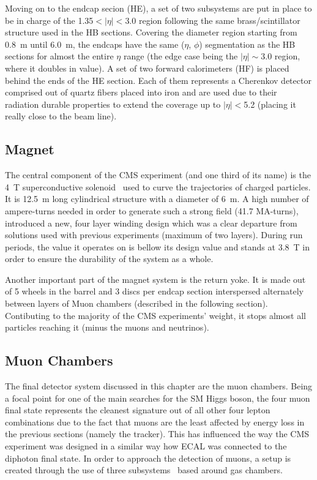 \hspace{10pt} Moving on to the endcap secion (HE), a set of two subsystems are put in place to be in charge of the 1.35$<|\eta|<$3.0 region following the same brass/scintillator structure used in the HB sections. Covering the diameter region starting from 0.8~m until 6.0~m, the endcaps have the same ($\eta$, $\phi$) segmentation as the HB sections for almost the entire $\eta$ range (the edge case being the $|\eta|\sim$3.0 region, where it doubles in value). A set of two forward calorimeters (HF) is placed behind the ends of the HE section. Each of them represents a Cherenkov detector comprised out of quartz fibers placed into iron and are used due to their radiation durable properties to extend the coverage up to $|\eta|<$5.2 (placing it really close to the beam line).


\subsection{Magnet}
\hspace{10pt} The central component of the CMS experiment (and one third of its name) is the 4~T superconductive solenoid~\cite{cms:paper} used to curve the trajectories of charged particles. It is 12.5~m long cylindrical structure with a diameter of 6~m. A high number of ampere-turns needed in order to generate such a strong field (41.7 MA-turns), introduced a new, four layer winding design which was a clear departure from solutions used with previous experiments (maximum of two layers). During run periods, the value it operates on is bellow its design value and stands at 3.8~T in order to ensure the durability of the system as a whole.

\hspace{10pt} Another important part of the magnet system is the return yoke. It is made out of 5 wheels in the barrel and 3 discs per endcap section interspersed alternately between layers of Muon chambers (described in the following section). Contibuting to the majority of the CMS experiments' weight, it stops almost all particles reaching it (minus the muons and neutrinos).
\subsection{Muon Chambers}
\label{subsec:cmsmuon}
\hspace{10pt} The final detector system discussed in this chapter are the muon chambers. Being a focal point for one of the main searches for the SM Higgs boson, the four muon final state represents the cleanest signature out of all other four lepton combinations due to the fact that muons are the least affected by energy loss in the previous sections (namely the tracker). This has influenced the way the CMS experiment was designed in a similar way how ECAL was connected to the diphoton final state. In order to approach the detection of muons, a setup is created through the use of three subsystems~\cite{cms:paper}\cite{muon_chambers_proceedings} based around gas chambers. 

